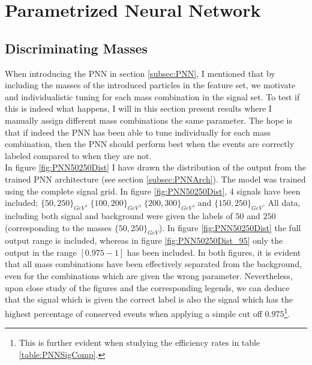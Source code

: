 \section{Parametrized Neural Network}
\subsection{Discriminating Masses}
When introducing the \ac{PNN} in section \ref{subsec:PNN}, I mentioned that by including the masses of the introduced particles
in the feature set, we motivate and individualistic tuning for each mass combination in the signal set. To test if this is indeed what 
happens, I will in this section present results where I manually assign different mass combinations the same parameter. The hope 
is that if indeed the \ac{PNN} has been able to tune individually for each mass combination, then the \ac{PNN} should perform best 
when the events are correctly labeled compared to when they are not. 
\\
In figure \ref{fig:PNN50250Dist} I have drawn the distribution of the output from the trained \ac{PNN} architecture 
(see section \ref{subsec:PNNArch}). The model was trained using the complete signal grid. In figure \ref{fig:PNN50250Dist},
4 signals have been included; $\{50,250\}_{GeV}$, $\{100,200\}_{GeV}$, $\{200,300\}_{GeV}$, and $\{150,250\}_{GeV}$. All data, including 
both signal and background were given the labels of $50$ and $250$ (corresponding to the masses $\{50,250\}_{GeV}$). 
In figure \ref{fig:PNN50250Dist} the full output range is included, whereas in figure \ref{fig:PNN50250Dist_95} only the output in the 
range $[0.975-1]$ has been included. In both figures, it is evident that all mass combinations have been effectively separated from the background,
even for the combinations which are given the wrong parameter. Nevertheless, upon close study of the figures and the corresponding legends, we can deduce that
the signal which is given the correct label is also the signal which has the highest percentage of conserved events when applying a simple cut off 
$0.975$\footnote{This is further evident when studying the efficiency rates in table \ref{table:PNNSigComp}.}.\\
